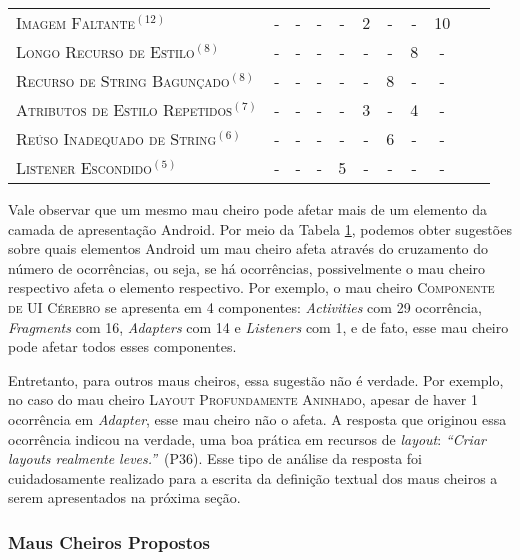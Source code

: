 \begin{table}[!htb]
\begin{tabular}{@{}p{7cm}@{}cccccccccp{3cm}}
\textsc{Imagem Faltante}$^{(12)}$                & -   & -   & -   & -   & 2    & -   & -   & 10 &  \\
\textsc{Longo Recurso de Estilo}$^{(8)}$         & -   & -   & -   & -   & -    & -   & 8   & -  &  \\
\textsc{Recurso de String Bagunçado}$^{(8)}$     & -   & -   & -   & -   & -    & 8   & -   & -  &  \\
\textsc{Atributos de Estilo Repetidos}$^{(7)}$   & -   & -   & -   & -   & 3    & -   & 4   & -  &  \\
\textsc{Reúso Inadequado de String}$^{(6)}$      & -   & -   & -   & -   & -    & 6   & -   & -  &  \\
\textsc{Listener Escondido}$^{(5)}$              & -   & -   & -   & 5   & -    & -   & -   & -  &  \\
\bottomrule
\end{tabular}
\label{tab:CategoriesVSFrequency}
\end{table}

Vale observar que um mesmo mau cheiro pode afetar mais de um elemento da camada de apresentação Android. Por meio da Tabela \ref{tab:CategoriesVSFrequency}, podemos obter sugestões sobre quais elementos Android um mau cheiro afeta através do cruzamento do número de ocorrências, ou seja, se há ocorrências, possivelmente o mau cheiro respectivo afeta o elemento respectivo. Por exemplo, o mau cheiro \textsc{\small Componente de UI Cérebro} se apresenta em 4 componentes: \textit{Activities} com 29 ocorrência, \textit{Fragments} com 16, \textit{Adapters} com 14 e \textit{Listeners} com 1, e de fato, esse mau cheiro pode afetar todos esses componentes.

Entretanto, para outros maus cheiros, essa sugestão não é verdade. Por exemplo, no caso do mau cheiro \textsc{\small Layout Profundamente Aninhado}, apesar de haver 1 ocorrência em \textit{Adapter}, esse mau cheiro não o afeta. A resposta que originou essa ocorrência indicou na verdade, uma boa prática em recursos de \textit{layout}: \textit{``Criar layouts realmente leves.''}~(P36). Esse tipo de análise da resposta foi cuidadosamente realizado para a escrita da definição textual dos maus cheiros a serem apresentados na próxima seção.


\subsubsection{Maus Cheiros Propostos}
\label{phase1-code-smells-derivation}


